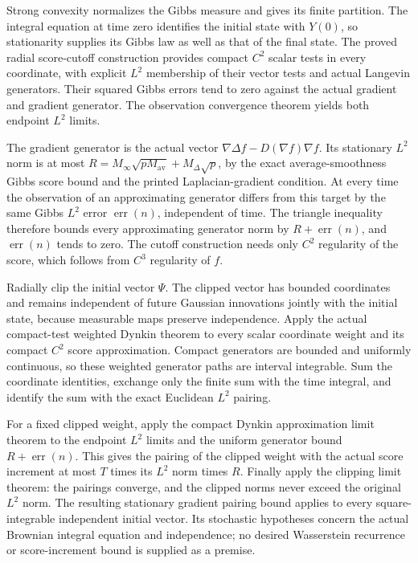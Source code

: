 \documentclass[11pt,a4paper]{report}
\begin{document}
Strong convexity normalizes the Gibbs measure and gives its finite partition. The integral equation at time zero identifies the initial state with \(Y(0)\), so stationarity supplies its Gibbs law as well as that of the final state. The proved radial score-cutoff construction provides compact \(C^{2}\) scalar tests in every coordinate, with explicit \(L^{2}\) membership of their vector tests and actual Langevin generators. Their squared Gibbs errors tend to zero against the actual gradient and gradient generator. The observation convergence theorem yields both endpoint \(L^{2}\) limits.



The gradient generator is the actual vector \(\nabla\Delta f-D(\nabla f)\nabla f\). Its stationary \(L^{2}\) norm is at most \(R=M_\infty\sqrt{pM_{\mathrm{av}}}+M_\Delta\sqrt p\), by the exact average-smoothness Gibbs score bound and the printed Laplacian-gradient condition. At every time the observation of an approximating generator differs from this target by the same Gibbs \(L^{2}\) error \(\operatorname{err}(n)\), independent of time. The triangle inequality therefore bounds every approximating generator norm by \(R+\operatorname{err}(n)\), and \(\operatorname{err}(n)\) tends to zero. The cutoff construction needs only \(C^{2}\) regularity of the score, which follows from \(C^{3}\) regularity of \(f\).



Radially clip the initial vector \(\Psi\). The clipped vector has bounded coordinates and remains independent of future Gaussian innovations jointly with the initial state, because measurable maps preserve independence. Apply the actual compact-test weighted Dynkin theorem to every scalar coordinate weight and its compact \(C^{2}\) score approximation. Compact generators are bounded and uniformly continuous, so these weighted generator paths are interval integrable. Sum the coordinate identities, exchange only the finite sum with the time integral, and identify the sum with the exact Euclidean \(L^{2}\) pairing.



For a fixed clipped weight, apply the compact Dynkin approximation limit theorem to the endpoint \(L^{2}\) limits and the uniform generator bound \(R+\operatorname{err}(n)\). This gives the pairing of the clipped weight with the actual score increment at most \(T\) times its \(L^{2}\) norm times \(R\). Finally apply the clipping limit theorem: the pairings converge, and the clipped norms never exceed the original \(L^{2}\) norm. The resulting stationary gradient pairing bound applies to every square-integrable independent initial vector. Its stochastic hypotheses concern the actual Brownian integral equation and independence; no desired Wasserstein recurrence or score-increment bound is supplied as a premise.
\end{document}
